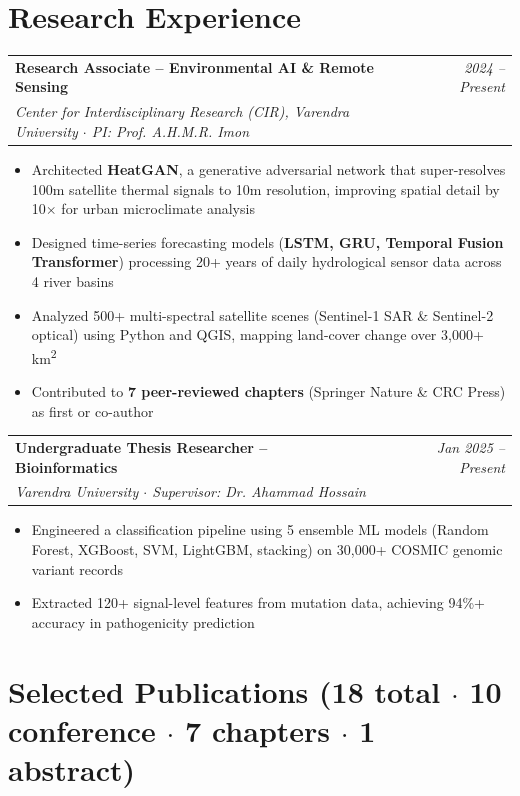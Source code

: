 \documentclass[11pt,a4paper]{article}
\makeatletter
\newcommand{\resumeSubheading}[4]{
  \vspace{4pt}
  \noindent
  \begin{tabular*}{\textwidth}{@{}l@{\extracolsep{\fill}}r@{}}
    \textbf{#1} & \textit{#2} \\
    \textit{\small #3} & \textit{\small #4} \\
  \end{tabular*}
}
\makeatother
\begin{document}
\section*{Research Experience}

\resumeSubheading
  {Research Associate -- Environmental AI \& Remote Sensing}{2024 -- Present}
  {Center for Interdisciplinary Research (CIR), Varendra University $\cdot$ PI: Prof. A.H.M.R. Imon}{}

\begin{itemize}
    \item Architected \textbf{HeatGAN}, a generative adversarial network that super-resolves 100m satellite thermal signals to 10m resolution, improving spatial detail by 10$\times$ for urban microclimate analysis
    \item Designed time-series forecasting models (\textbf{LSTM, GRU, Temporal Fusion Transformer}) processing 20+ years of daily hydrological sensor data across 4 river basins
    \item Analyzed 500+ multi-spectral satellite scenes (Sentinel-1 SAR \& Sentinel-2 optical) using Python and QGIS, mapping land-cover change over 3,000+ km\textsuperscript{2}
    \item Contributed to \textbf{7 peer-reviewed chapters} (Springer Nature \& CRC Press) as first or co-author
\end{itemize}

\vspace{6pt}
\resumeSubheading
  {Undergraduate Thesis Researcher -- Bioinformatics}{Jan 2025 -- Present}
  {Varendra University $\cdot$ Supervisor: Dr. Ahammad Hossain}{}

\begin{itemize}
    \item Engineered a classification pipeline using 5 ensemble ML models (Random Forest, XGBoost, SVM, LightGBM, stacking) on 30,000+ COSMIC genomic variant records
    \item Extracted 120+ signal-level features from mutation data, achieving 94\%+ accuracy in pathogenicity prediction
\end{itemize}

\section*{Selected Publications {\small\normalfont\color{textgray}(18 total $\cdot$ 10 conference $\cdot$ 7 chapters $\cdot$ 1 abstract)}}
\end{document}
